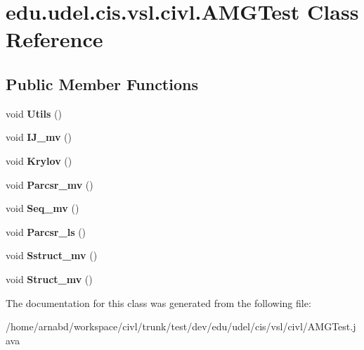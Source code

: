 \hypertarget{classedu_1_1udel_1_1cis_1_1vsl_1_1civl_1_1AMGTest}{}\section{edu.\+udel.\+cis.\+vsl.\+civl.\+A\+M\+G\+Test Class Reference}
\label{classedu_1_1udel_1_1cis_1_1vsl_1_1civl_1_1AMGTest}
\subsection*{Public Member Functions}
\begin{DoxyCompactItemize}
\item 
\hypertarget{classedu_1_1udel_1_1cis_1_1vsl_1_1civl_1_1AMGTest_a56e9aac55f83cb5c3e7fd6667a8900c0}{}void {\bfseries Utils} ()\label{classedu_1_1udel_1_1cis_1_1vsl_1_1civl_1_1AMGTest_a56e9aac55f83cb5c3e7fd6667a8900c0}

\item 
\hypertarget{classedu_1_1udel_1_1cis_1_1vsl_1_1civl_1_1AMGTest_a36b109a861e9015ebd9eda0ded774aa5}{}void {\bfseries I\+J\+\_\+mv} ()\label{classedu_1_1udel_1_1cis_1_1vsl_1_1civl_1_1AMGTest_a36b109a861e9015ebd9eda0ded774aa5}

\item 
\hypertarget{classedu_1_1udel_1_1cis_1_1vsl_1_1civl_1_1AMGTest_a2a37a8c612610e0be72a77537f5cf6da}{}void {\bfseries Krylov} ()\label{classedu_1_1udel_1_1cis_1_1vsl_1_1civl_1_1AMGTest_a2a37a8c612610e0be72a77537f5cf6da}

\item 
\hypertarget{classedu_1_1udel_1_1cis_1_1vsl_1_1civl_1_1AMGTest_a308ddfb958b8bbf905c07543683fec41}{}void {\bfseries Parcsr\+\_\+mv} ()\label{classedu_1_1udel_1_1cis_1_1vsl_1_1civl_1_1AMGTest_a308ddfb958b8bbf905c07543683fec41}

\item 
\hypertarget{classedu_1_1udel_1_1cis_1_1vsl_1_1civl_1_1AMGTest_a6320092e94225a29bc7538fe4eb7c5dd}{}void {\bfseries Seq\+\_\+mv} ()\label{classedu_1_1udel_1_1cis_1_1vsl_1_1civl_1_1AMGTest_a6320092e94225a29bc7538fe4eb7c5dd}

\item 
\hypertarget{classedu_1_1udel_1_1cis_1_1vsl_1_1civl_1_1AMGTest_a6365d68853bb4f74497adc4ad42e5e43}{}void {\bfseries Parcsr\+\_\+ls} ()\label{classedu_1_1udel_1_1cis_1_1vsl_1_1civl_1_1AMGTest_a6365d68853bb4f74497adc4ad42e5e43}

\item 
\hypertarget{classedu_1_1udel_1_1cis_1_1vsl_1_1civl_1_1AMGTest_a759a63413c603c39845486a59fb8dc54}{}void {\bfseries Sstruct\+\_\+mv} ()\label{classedu_1_1udel_1_1cis_1_1vsl_1_1civl_1_1AMGTest_a759a63413c603c39845486a59fb8dc54}

\item 
\hypertarget{classedu_1_1udel_1_1cis_1_1vsl_1_1civl_1_1AMGTest_a7a0bf6d7c47cc90841e793701fbfec43}{}void {\bfseries Struct\+\_\+mv} ()\label{classedu_1_1udel_1_1cis_1_1vsl_1_1civl_1_1AMGTest_a7a0bf6d7c47cc90841e793701fbfec43}

\end{DoxyCompactItemize}


The documentation for this class was generated from the following file\+:\begin{DoxyCompactItemize}
\item 
/home/arnabd/workspace/civl/trunk/test/dev/edu/udel/cis/vsl/civl/A\+M\+G\+Test.\+java\end{DoxyCompactItemize}
